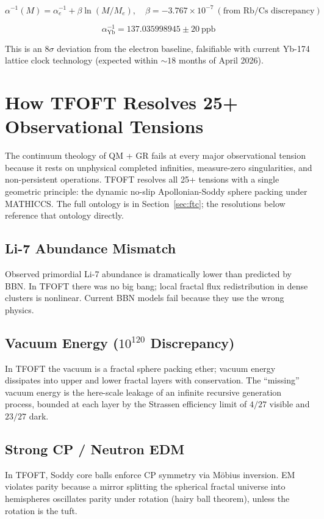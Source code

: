 \documentclass[11pt,a4paper]{article}
\begin{document}
\[
  \alpha^{-1}(M) = \alpha^{-1}_e + \beta\ln(M/M_e),
  \quad \beta = -3.767\times10^{-7}\ (\text{from Rb/Cs discrepancy})
\]

\[
  \boxed{\alpha^{-1}_{\text{Yb}} = 137.035998945 \pm 20\ \text{ppb}}
\]

This is an $8\sigma$ deviation from the electron baseline, falsifiable with current
Yb-174 lattice clock technology (expected within $\sim18$ months of April 2026).


\section{How TFOFT Resolves 25+ Observational Tensions}

The continuum theology of QM + GR fails at every major observational tension
because it rests on unphysical completed infinities, measure-zero singularities,
and non-persistent operations. TFOFT resolves all 25+ tensions with a single
geometric principle: the dynamic no-slip Apollonian-Soddy sphere packing under
MATHICCS. The full ontology is in Section~\ref{sec:ftc}; the resolutions below
reference that ontology directly.

\subsection{Li-7 Abundance Mismatch}
Observed primordial Li-7 abundance is dramatically lower than predicted by BBN. In
TFOFT there was no big bang; local fractal flux redistribution in dense clusters is
nonlinear. Current BBN models fail because they use the wrong physics.

\subsection{Vacuum Energy ($10^{120}$ Discrepancy)}
In TFOFT the vacuum is a fractal sphere packing ether; vacuum energy dissipates into
upper and lower fractal layers with conservation. The ``missing'' vacuum energy is
the here-scale leakage of an infinite recursive generation process, bounded at each
layer by the Strassen efficiency limit of $4/27$ visible and $23/27$ dark.

\subsection{Strong CP / Neutron EDM}
In TFOFT, Soddy core balls enforce CP symmetry via M\"obius inversion. EM violates
parity because a mirror splitting the spherical fractal universe into hemispheres
oscillates parity under rotation (hairy ball theorem), unless the rotation is the
tuft.
\end{document}
